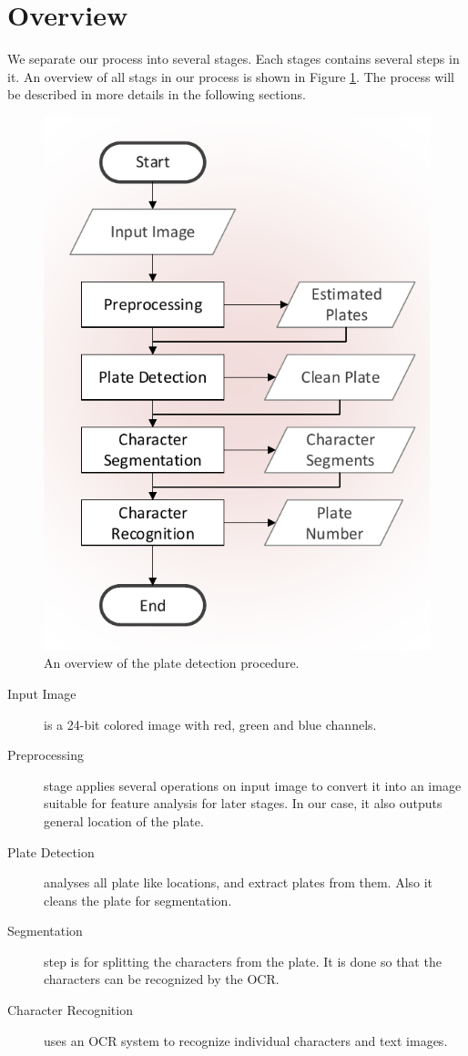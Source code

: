 \documentclass{standalone}
\begin{document}
\section{Overview}
We separate our process into several stages. Each stages contains several steps in it. An overview of all stags in our process is shown in Figure \ref{fig:ProcessOverview}. The process will be described in more details in the following sections.

\begin{figure} 
	\centering
	\includegraphics[width=0.65\linewidth]{./img/plots/overview}
	\caption{An overview of the plate detection procedure.} 
	\label{fig:ProcessOverview}
\end{figure}

\begin{description}
\item [Input Image] is a 24-bit colored image with red, green and blue channels.
\item [Preprocessing] stage applies several operations on input image to convert it into an image suitable for feature analysis for later stages. In our case, it also outputs general location of the plate.
\item [Plate Detection] analyses all plate like locations, and extract plates from them. Also it cleans the plate for segmentation.
\item [Segmentation] step is for splitting the characters from the plate. It is done so that the characters can be recognized by the OCR.
\item [Character Recognition] uses an OCR system to recognize individual characters and text images.
\end{description}
\end{document}
